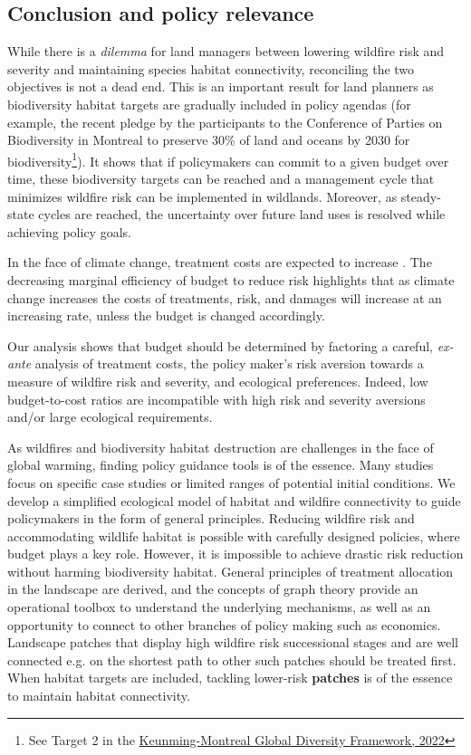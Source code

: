 \subsection{Conclusion and policy relevance}
While there is a \textit{dilemma} for land managers between lowering wildfire risk and severity and maintaining species habitat connectivity, reconciling the two objectives is not a dead end. This is an important result for land planners as biodiversity habitat targets are gradually included in policy agendas (for example, the recent pledge by the participants to the Conference of Parties on Biodiversity in Montreal to preserve 30\% of land and oceans by 2030 for biodiversity\footnote{See Target 2 in the \href{https://www.cbd.int/article/cop15-cbd-press-release-final-19dec2022 }{Keunming-Montreal Global Diversity Framework, 2022}}). It shows that if policymakers can commit to a given budget over time, these biodiversity targets can be reached and a management cycle that minimizes wildfire risk can be implemented in wildlands. Moreover, as steady-state cycles are reached, the uncertainty over future land uses is resolved while achieving policy goals.

In the face of climate change, treatment costs are expected to increase \citep{Kupfer2020}. The decreasing marginal efficiency of budget to reduce risk highlights that as climate change increases the costs of treatments, risk, and damages will increase at an increasing rate, unless the budget is changed accordingly.

Our analysis shows that budget should be determined by factoring a careful, \textit{ex-ante} analysis of treatment costs, the policy maker's risk aversion towards a measure of wildfire risk and severity, and ecological preferences.  Indeed, low budget-to-cost ratios are incompatible with high risk and severity aversions and/or large ecological requirements.

As wildfires and biodiversity habitat destruction are challenges in the face of global warming, finding policy guidance tools is of the essence. Many studies focus on specific case studies or limited ranges of potential initial conditions. We develop a simplified ecological model of habitat and wildfire connectivity to guide policymakers in the form of general principles. Reducing wildfire risk and accommodating wildlife habitat is possible with carefully designed policies, where budget plays a key role. However, it is impossible to achieve drastic risk reduction without harming biodiversity habitat. General principles of treatment allocation in the landscape are derived, and the concepts of graph theory provide an operational toolbox to understand the underlying mechanisms, as well as an opportunity to connect to other branches of policy making such as economics. Landscape patches that display high wildfire risk successional stages and are well connected  e.g. on the shortest path to other such patches should be treated first. When habitat targets are included, tackling lower-risk \textbf{patches} is of the essence to maintain habitat connectivity. 


